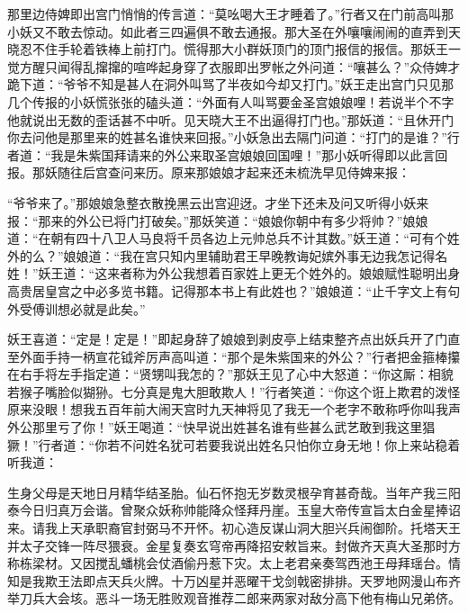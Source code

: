 \documentclass[12pt,UTF8]{ctexbook}
\begin{document}
那里边侍婢即出宫门悄悄的传言道：“莫吆喝大王才睡着了。”行者又在门前高叫那小妖又不敢去惊动。如此者三四遍俱不敢去通报。那大圣在外嚷嚷闹闹的直弄到天晓忍不住手轮着铁棒上前打门。慌得那大小群妖顶门的顶门报信的报信。那妖王一觉方醒只闻得乱撺撺的喧哗起身穿了衣服即出罗帐之外问道：“嚷甚么？”众侍婢才跪下道：“爷爷不知是甚人在洞外叫骂了半夜如今却又打门。”妖王走出宫门只见那几个传报的小妖慌张张的磕头道：“外面有人叫骂要金圣宫娘娘哩！若说半个不字他就说出无数的歪话甚不中听。见天晓大王不出逼得打门也。”那妖道：“且休开门你去问他是那里来的姓甚名谁快来回报。”小妖急出去隔门问道：“打门的是谁？”行者道：“我是朱紫国拜请来的外公来取圣宫娘娘回国哩！”那小妖听得即以此言回报。那妖随往后宫查问来历。原来那娘娘才起来还未梳洗早见侍婢来报：

“爷爷来了。”那娘娘急整衣散挽黑云出宫迎迓。才坐下还未及问又听得小妖来报：“那来的外公已将门打破矣。”那妖笑道：“娘娘你朝中有多少将帅？”娘娘道：“在朝有四十八卫人马良将千员各边上元帅总兵不计其数。”妖王道：“可有个姓外的么？”娘娘道：“我在宫只知内里辅助君王早晚教诲妃嫔外事无边我怎记得名姓！”妖王道：“这来者称为外公我想着百家姓上更无个姓外的。娘娘赋性聪明出身高贵居皇宫之中必多览书籍。记得那本书上有此姓也？”娘娘道：“止千字文上有句外受傅训想必就是此矣。”

妖王喜道：“定是！定是！”即起身辞了娘娘到剥皮亭上结束整齐点出妖兵开了门直至外面手持一柄宣花钺斧厉声高叫道：“那个是朱紫国来的外公？”行者把金箍棒攥在右手将左手指定道：“贤甥叫我怎的？”那妖王见了心中大怒道：“你这厮：相貌若猴子嘴脸似猢狲。七分真是鬼大胆敢欺人！”行者笑道：“你这个诳上欺君的泼怪原来没眼！想我五百年前大闹天宫时九天神将见了我无一个老字不敢称呼你叫我声外公那里亏了你！”妖王喝道：“快早说出姓甚名谁有些甚么武艺敢到我这里猖獗！”行者道：“你若不问姓名犹可若要我说出姓名只怕你立身无地！你上来站稳着听我道：

生身父母是天地日月精华结圣胎。仙石怀抱无岁数灵根孕育甚奇哉。当年产我三阳泰今日归真万会谐。曾聚众妖称帅能降众怪拜丹崖。玉皇大帝传宣旨太白金星捧诏来。请我上天承职裔官封弼马不开怀。初心造反谋山洞大胆兴兵闹御阶。托塔天王并太子交锋一阵尽猥衰。金星复奏玄穹帝再降招安敕旨来。封做齐天真大圣那时方称栋梁材。又因搅乱蟠桃会仗酒偷丹惹下灾。太上老君亲奏驾西池王母拜瑶台。情知是我欺王法即点天兵火牌。十万凶星并恶曜干戈剑戟密排排。天罗地网漫山布齐举刀兵大会垓。恶斗一场无胜败观音推荐二郎来两家对敌分高下他有梅山兄弟侪。
\end{document}
